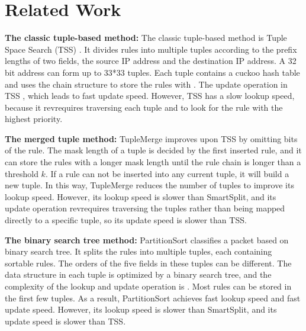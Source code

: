 \section{Related Work}


\textbf{The classic tuple-based method:} The classic tuple-based method is Tuple Space Search (TSS) \cite{srinivasan1999packet}. It divides rules into multiple tuples according to the prefix lengths of two fields, the source IP address and the destination IP address. A 32 bit address can form up to 33*33 tuples. Each tuple contains a cuckoo hash table and uses the chain structure to store the rules with .  The update operation in TSS ,  which leads to fast update speed. However, TSS has a slow lookup speed, because it rev{requires traversing} each tuple and to look for the rule with the highest priority.

\textbf{The merged tuple method:} TupleMerge \cite{daly2017tuplemerge} improves upon TSS by omitting bits of the rule. The mask length of a tuple is decided by the first inserted rule, and it can store the rules with a longer mask length until the rule chain is longer than a threshold $k$. If a rule can not be inserted into any current tuple, it will build a new tuple. In this way, TupleMerge reduces the number of tuples to improve its lookup speed. However, its lookup speed is slower than SmartSplit, and its update operation rev{requires traversing} the tuples rather than being mapped directly to a specific tuple, so its update speed is slower than TSS.


\textbf{The binary search tree method:} PartitionSort \cite{yingchareonthawornchai2016sorted} classifies a packet based on binary search tree. It splits the rules into multiple tuples, each containing sortable rules. The orders of the five fields in these tuples can be different. The data structure in each tuple is optimized by a binary search tree, and the complexity of the lookup and update operation is .   Most rules can be stored in the first few tuples. As a result, PartitionSort achieves fast lookup speed and fast update speed. However, its lookup speed is slower than SmartSplit, and its update speed is slower than TSS.



